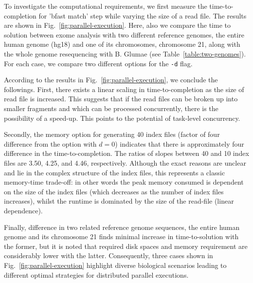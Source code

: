 \documentclass{acm_proc_article-sp}
\begin{document}

To investigate the computational requirements, we first measure the
time-to-completion for 'bfast match' step while varying the size of a
read file.  The results are shown in
Fig.~\ref{fig:parallel-execution}. %
Here, also we compare the time to solution between exome analysis with two different reference genomes, the entire human genome (hg18) and one of its chromosomes, chromosome 21, along with the whole genome resequencing with B. Glumae (see Table~\ref{table:two-genomes}).   For each case, we compare two different options for the \texttt{-d} flag.   

According to the results in Fig.~\ref{fig:parallel-execution}, we conclude the followings. First, there exists a linear scaling in time-to-completion as the size of read file is increased.  This suggests that if the read
files can be broken up into smaller fragments and which can be
processed concurrently, there is the possibility of a speed-up. This
points to the potential of task-level concurrency.

Secondly, the memory option for generating 40 index files (factor of four difference from the option with  $d=0$) indicates that there is approximately four difference in the time-to-completion.  The ratios of slopes between 40 and 10 index files are 3.50, 4.25, and 4.46, respectively.  Although the exact reasons are unclear and lie in the
complex structure of the index files, this represents a classic
memory-time trade-off: in other words the peak memory consumed is
dependent on the size of the index files (which decreases as the
number of index files increases), whilst the runtime is dominated by
the size of the read-file (linear dependence).

Finally, difference in two related reference genome sequences, the entire human genome and its chromosome 21 finds minimal increase in time-to-solution with the former, but it is noted that required disk spaces and memory requirement are considerably lower with the latter.  Consequently, three cases shown in Fig.~\ref{fig:parallel-execution} highlight diverse biological scenarios leading to different optimal strategies for distributed parallel executions.
\end{document}
